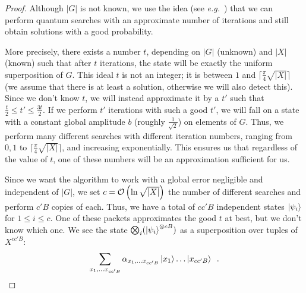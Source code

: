 \begin{proof}
Although $|G|$ is not known, we use the idea (see \emph{e.g.}~\cite{brassard2002quantum}) that  we can perform quantum searches with an approximate number of iterations and still obtain solutions with a good probability.


More precisely, there exists a number $t$, depending on $|G|$ (unknown) and $|X|$ (known) such that after $t$ iterations, the state will be exactly the uniform superposition of $G$. This ideal $t$ is not an integer; it is between $1$ and $\lceil\frac{\pi}{4} \sqrt{|X|} \rceil$ (we assume that there is at least a solution, otherwise we will also detect this). Since we don't know $t$, we will instead approximate it by a $t'$ such that $\frac{t}{2} \leq t' \leq \frac{3t}{2}$. If we perform $t'$ iterations with such a good $t'$, we will fall on a state with a constant global amplitude $b$ (roughly $\frac{1}{\sqrt{2}}$) on elements of $G$. Thus, we perform many different searches with different iteration numbers, ranging from $0, 1$ to $\lceil\frac{\pi}{4} \sqrt{|X|} \rceil$, and increasing exponentially. This ensures us that regardless of the value of $t$, one of these numbers will be an approximation sufficient for us.

Since we want the algorithm to work with a global error negligible and independent of $|G|$, we set $c = \mathcal{O} \left(\ln \sqrt{|X|}   \right)$ the number of different searches and perform $c' B$ copies of each. Thus, we have a total of $c c' B$ independent states $\left| \psi_i \right\rangle$ for $1 \leq i \leq c$. One of these packets approximates the good $t$ at best, but we don't know which one. We see the state $\bigotimes_i (\left| \psi_i \right\rangle^{\otimes cB})$ as a superposition over tuples of $X^{c c' B}$:
$$ \sum_{x_1, \ldots x_{c c'B}} \alpha_{x_1, \ldots x_{c c'B}}\left| x_1 \right\rangle \ldots \left| x_{c c'B} \right\rangle \enspace. $$


%


\end{proof}
